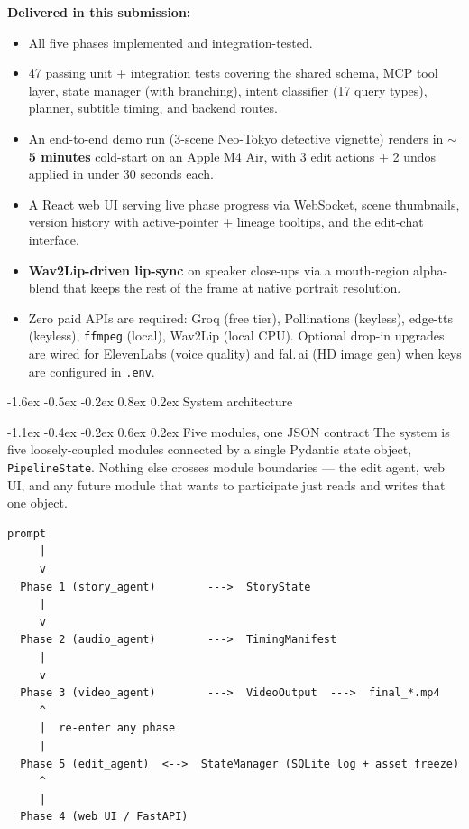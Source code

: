 \documentclass[11pt,a4paper]{article}
\makeatletter
\renewcommand\section{\@startsection{section}{1}{\z@}%
   {-1.6ex \@plus -0.5ex \@minus -0.2ex}%
   {0.8ex \@plus 0.2ex}%
   {\Large\bfseries\color{accent}}}
\renewcommand\subsection{\@startsection{subsection}{2}{\z@}%
   {-1.1ex \@plus -0.4ex \@minus -0.2ex}%
   {0.6ex \@plus 0.2ex}%
   {\large\bfseries\color{accent!85!black}}}
\newcommand{\code}[1]{\texttt{\small #1}}
\makeatother
\begin{document}
\smallskip
\textbf{Delivered in this submission:}
\begin{itemize}
  \item All five phases implemented and integration-tested.
  \item 47 passing unit + integration tests covering the shared schema, MCP tool
        layer, state manager (with branching), intent classifier (17 query types),
        planner, subtitle timing, and backend routes.
  \item An end-to-end demo run (3-scene Neo-Tokyo detective vignette) renders in
        \textbf{$\sim$5 minutes} cold-start on an Apple M4 Air, with 3 edit actions
        + 2 undos applied in under 30 seconds each.
  \item A React web UI serving live phase progress via WebSocket, scene thumbnails,
        version history with active-pointer + lineage tooltips, and the edit-chat
        interface.
  \item \textbf{Wav2Lip-driven lip-sync} on speaker close-ups via a
        mouth-region alpha-blend that keeps the rest of the frame at native
        portrait resolution.
  \item Zero paid APIs are required: Groq (free tier), Pollinations (keyless),
        edge-tts (keyless), \code{ffmpeg} (local), Wav2Lip (local CPU). Optional
        drop-in upgrades are wired for ElevenLabs (voice quality) and fal.\,ai
        (HD image gen) when keys are configured in \code{.env}.
\end{itemize}

\section{System architecture}

\subsection{Five modules, one JSON contract}
The system is five loosely-coupled modules connected by a single Pydantic state
object, \code{PipelineState}. Nothing else crosses module boundaries --- the
edit agent, web UI, and any future module that wants to participate just reads
and writes that one object.

\smallskip
\begin{lstlisting}[language={}]
   prompt
     |
     v
  Phase 1 (story_agent)        --->  StoryState
     |
     v
  Phase 2 (audio_agent)        --->  TimingManifest
     |
     v
  Phase 3 (video_agent)        --->  VideoOutput  --->  final_*.mp4
     ^
     |  re-enter any phase
     |
  Phase 5 (edit_agent)  <-->  StateManager (SQLite log + asset freeze)
     ^
     |
  Phase 4 (web UI / FastAPI)
\end{lstlisting}
\end{document}
